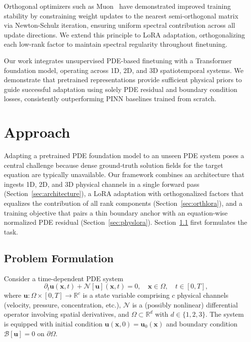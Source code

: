 \documentclass{article}
\begin{document}
Orthogonal optimizers such as Muon~\cite{jordan2024muon} have demonstrated improved training stability by constraining weight updates to the nearest semi-orthogonal matrix via Newton-Schulz iteration, ensuring uniform spectral contribution across all update directions. We extend this principle to LoRA adaptation, orthogonalizing each low-rank factor to maintain spectral regularity throughout finetuning.

Our work integrates unsupervised PDE-based finetuning with a Transformer foundation model, operating across 1D, 2D, and 3D spatiotemporal systems. We demonstrate that pretrained representations provide sufficient physical priors to guide successful adaptation using solely PDE residual and boundary condition losses, consistently outperforming PINN baselines trained from scratch.


\section{Approach}
\label{sec:method}

Adapting a pretrained PDE foundation model to an unseen PDE system poses a central challenge because dense ground-truth solution fields for the target equation are typically unavailable. Our framework combines an architecture that ingests 1D, 2D, and 3D physical channels in a single forward pass (Section~\ref{sec:architecture}), a LoRA adaptation with orthogonalized factors that equalizes the contribution of all rank components (Section~\ref{sec:orthlora}), and a training objective that pairs a thin boundary anchor with an equation-wise normalized PDE residual (Section~\ref{sec:physlora}). Section~\ref{sec:formulation} first formulates the task.

\subsection{Problem Formulation}
\label{sec:formulation}

Consider a time-dependent PDE system
\begin{equation}
\partial_t \mathbf{u}(\mathbf{x}, t) + \mathcal{N}[\mathbf{u}](\mathbf{x}, t) = 0, \quad \mathbf{x} \in \Omega, \quad t \in [0, T],
\end{equation}
where $\mathbf{u}\!: \Omega \times [0,T] \to \mathbb{R}^c$ is a state variable comprising $c$ physical channels (velocity, pressure, concentration, etc.), $\mathcal{N}$ is a (possibly nonlinear) differential operator involving spatial derivatives, and $\Omega \subset \mathbb{R}^d$ with $d \in \{1,2,3\}$. The system is equipped with initial condition $\mathbf{u}(\mathbf{x}, 0) = \mathbf{u}_0(\mathbf{x})$ and boundary condition $\mathcal{B}[\mathbf{u}] = 0$ on $\partial\Omega$.
\end{document}
